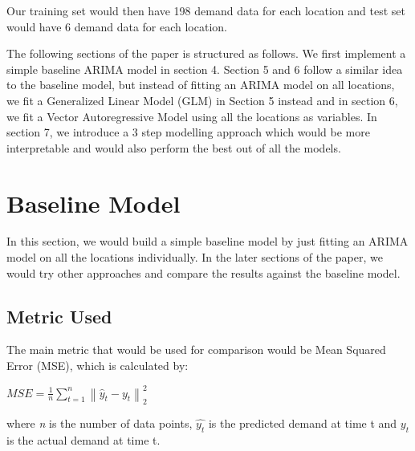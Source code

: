 \documentclass[12pt, letterpaper] {article}
\begin{document}
\noindent Our training set would then have 198 demand data for each location and test set would have 6 demand data for each location. 

\noindent The following sections of the paper is structured as follows. We first implement a simple baseline ARIMA model in section 4. Section 5 and 6 follow a similar idea to the baseline model, but instead of fitting an ARIMA model on all locations, we fit a Generalized Linear Model (GLM) in Section 5 instead and in section 6, we fit a Vector Autoregressive Model using all the locations as variables. In section 7, we introduce a 3 step modelling approach which would be more interpretable and would also perform the best out of all the models. 

\newpage

\section{Baseline Model}
In this section, we would build a simple baseline model by just fitting an ARIMA model on all the locations individually. In the later sections of the paper, we would try other approaches and compare the results against the baseline model. 

\subsection{Metric Used}
The main metric that would be used for comparison would be Mean Squared Error (MSE), which is calculated by:

\begin{center}
    $\displaystyle MSE=\frac{1}{n}\sum_{t=1}^{n}\left \| \hat{y}_{t} - y_{t} \right \|_{2}^{2}$
\end{center}
where \textit{n} is the number of data points, $\hat{y_t}$ is the predicted demand at time t and ${y_t}$ is the actual demand at time t.
\end{document}
